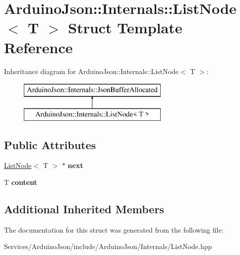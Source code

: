 \hypertarget{struct_arduino_json_1_1_internals_1_1_list_node}{}\section{Arduino\+Json\+:\+:Internals\+:\+:List\+Node$<$ T $>$ Struct Template Reference}
\label{struct_arduino_json_1_1_internals_1_1_list_node}
Inheritance diagram for Arduino\+Json\+:\+:Internals\+:\+:List\+Node$<$ T $>$\+:\begin{figure}[H]
\begin{center}
\leavevmode
\includegraphics[height=2.000000cm]{struct_arduino_json_1_1_internals_1_1_list_node}
\end{center}
\end{figure}
\subsection*{Public Attributes}
\begin{DoxyCompactItemize}
\item 
\hypertarget{struct_arduino_json_1_1_internals_1_1_list_node_af02682d631b75f87db9e877b7c099b40}{}\hyperlink{struct_arduino_json_1_1_internals_1_1_list_node}{List\+Node}$<$ T $>$ $\ast$ {\bfseries next}\label{struct_arduino_json_1_1_internals_1_1_list_node_af02682d631b75f87db9e877b7c099b40}

\item 
\hypertarget{struct_arduino_json_1_1_internals_1_1_list_node_a959fc0e35711df83d3edd13015c8ee5f}{}T {\bfseries content}\label{struct_arduino_json_1_1_internals_1_1_list_node_a959fc0e35711df83d3edd13015c8ee5f}

\end{DoxyCompactItemize}
\subsection*{Additional Inherited Members}


The documentation for this struct was generated from the following file\+:\begin{DoxyCompactItemize}
\item 
Services/\+Arduino\+Json/include/\+Arduino\+Json/\+Internals/List\+Node.\+hpp\end{DoxyCompactItemize}
